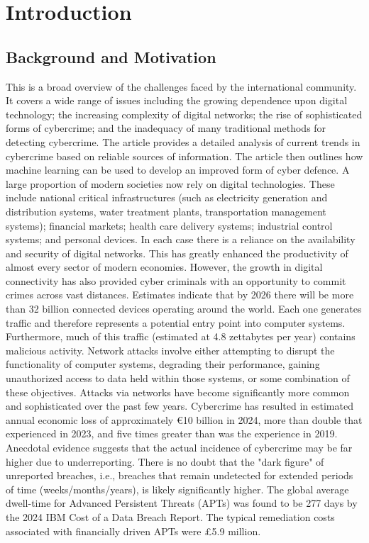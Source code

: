 \chapter{Introduction}
\label{chap:intro}
\setlength{\parskip}{0.8em}

\section{Background and Motivation}

This is a broad overview of the challenges faced by the international community. It covers a wide range of issues including the growing dependence upon digital technology; the increasing complexity of digital networks; the rise of sophisticated forms of cybercrime; and the inadequacy of many traditional methods for detecting cybercrime. The article provides a detailed analysis of current trends in cybercrime based on reliable sources of information. The article then outlines how machine learning can be used to develop an improved form of cyber defence.
A large proportion of modern societies now rely on digital technologies. These include national critical infrastructures (such as electricity generation and distribution systems, water treatment plants, transportation management systems); financial markets; health care delivery systems; industrial control systems; and personal devices. In each case there is a reliance on the availability and security of digital networks. This has greatly enhanced the productivity of almost every sector of modern economies. However, the growth in digital connectivity has also provided cyber criminals with an opportunity to commit crimes across vast distances.
Estimates indicate that by 2026 there will be more than 32 billion connected devices operating around the world. Each one generates traffic and therefore represents a potential entry point into computer systems. Furthermore, much of this traffic (estimated at 4.8 zettabytes per year) contains malicious activity. Network attacks involve either attempting to disrupt the functionality of computer systems, degrading their performance, gaining unauthorized access to data held within those systems, or some combination of these objectives. Attacks via networks have become significantly more common and sophisticated over the past few years.
Cybercrime has resulted in estimated annual economic loss of approximately €10 billion in 2024, more than double that experienced in 2023, and five times greater than was the experience in 2019. Anecdotal evidence suggests that the actual incidence of cybercrime may be far higher due to underreporting. There is no doubt that the "dark figure" of unreported breaches, i.e., breaches that remain undetected for extended periods of time (weeks/months/years), is likely significantly higher. The global average dwell-time for Advanced Persistent Threats (APTs) was found to be 277 days by the 2024 IBM Cost of a Data Breach Report. The typical remediation costs associated with financially driven APTs were £5.9 million.
